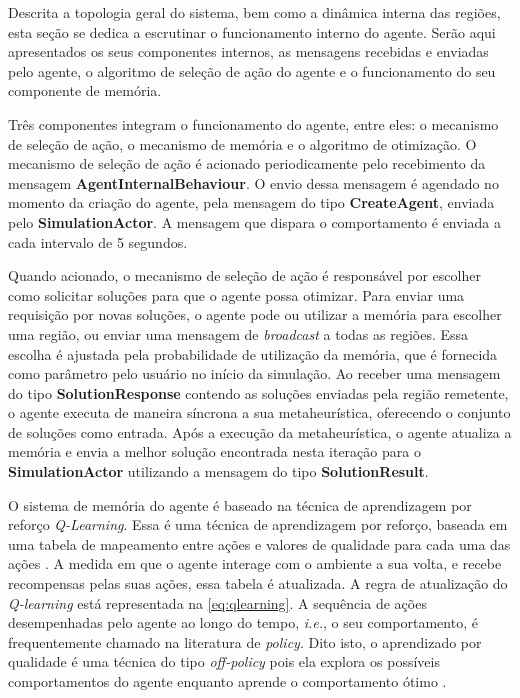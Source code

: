 Descrita a topologia geral do sistema, bem como a dinâmica interna das regiões, esta seção se dedica a escrutinar o funcionamento interno do agente. Serão aqui apresentados os seus componentes internos, as mensagens recebidas e enviadas pelo agente, o algoritmo de seleção de ação do agente e o funcionamento do seu componente de memória.

Três componentes integram o funcionamento do agente, entre eles: o mecanismo de seleção de ação, o mecanismo de memória e o algoritmo de otimização. O mecanismo de seleção de ação é acionado periodicamente pelo recebimento da mensagem \textbf{AgentInternalBehaviour}. O envio dessa mensagem é agendado no momento da criação do agente, pela mensagem do tipo \textbf{CreateAgent}, enviada pelo \textbf{SimulationActor}. A mensagem que dispara o comportamento é enviada a cada intervalo de  5 segundos. 

Quando acionado, o mecanismo de seleção de ação é responsável por escolher como solicitar soluções para que o agente possa otimizar. Para enviar uma requisição por novas soluções, o agente pode ou utilizar a memória para escolher uma região, ou enviar uma mensagem de \textit{broadcast} a todas as regiões. Essa escolha é ajustada pela probabilidade de utilização da memória, que é fornecida como parâmetro pelo usuário no início da simulação. Ao receber uma mensagem do tipo \textbf{SolutionResponse} contendo as soluções enviadas pela região remetente, o agente executa de maneira síncrona a sua metaheurística, oferecendo o conjunto de soluções como entrada. Após a execução da metaheurística, o agente atualiza a memória e envia a melhor solução encontrada nesta iteração para o \textbf{SimulationActor} utilizando a mensagem do tipo \textbf{SolutionResult}. 

O sistema de memória do agente é baseado na técnica de aprendizagem por reforço  \textit{Q-Learning}. Essa é uma técnica de aprendizagem por reforço, baseada em uma tabela de mapeamento entre ações e valores de qualidade para cada uma das ações \cite{norvig2018}. A medida em que o agente interage com o ambiente a sua volta, e recebe recompensas pelas suas ações, essa tabela é atualizada. A regra de atualização do \textit{Q-learning} está representada na \autoref{eq:qlearning}. A sequência de ações desempenhadas pelo agente ao longo do tempo, \textit{i.e.}, o seu comportamento, é frequentemente chamado na literatura de \textit{policy}. Dito isto, o aprendizado por qualidade é uma técnica do tipo \textit{off-policy} pois ela explora os possíveis comportamentos do agente enquanto aprende o comportamento ótimo \cite{sutton2018}.

